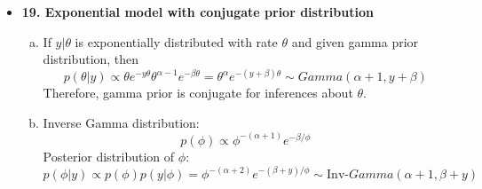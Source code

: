 \documentclass{article}
\begin{document}
\begin{itemize}
\item \textbf{19. Exponential model with conjugate prior distribution}

\begin{enumerate}[(a)]

\item If $y|\theta$ is exponentially distributed with rate $\theta$ and given gamma prior distribution, then
$$
p(\theta|y) \propto \theta e^{-y\theta} \theta^{\alpha - 1} e^{-\beta \theta} = \theta^{\alpha} e^{-(y+\beta)\theta} \sim Gamma(\alpha + 1, y+\beta)
$$
Therefore, gamma prior is conjugate for inferences about $\theta$. 

\item Inverse Gamma distribution:
$$
p(\phi) \propto \phi^{-(\alpha+1)}e^{-\beta / \phi}
$$
Posterior distribution of $\phi$:
$$
p(\phi | y) \propto p(\phi) p(y|\phi) = \phi^{-(\alpha+2)}e^{-(\beta+y) / \phi} \sim \text{Inv-}Gamma (\alpha+1, \beta+y)
$$



\end{enumerate}
\end{itemize}
\end{document}
